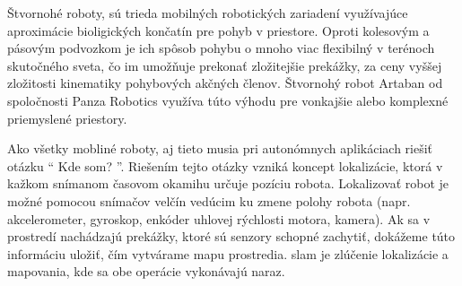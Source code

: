 Štvornohé roboty, sú trieda mobilných robotických zariadení využívajúce aproximácie bioligických končatín pre pohyb v priestore.\newline
Oproti kolesovým a pásovým podvozkom je ich spôsob pohybu o mnoho viac flexibilný v terénoch skutočného sveta, čo im umožňuje prekonať zložitejšie prekážky, za ceny vyššej zložitosti kinematiky pohybových akčných členov.\newline
Štvornohý robot Artaban od spoločnosti Panza Robotics využíva túto výhodu pre vonkajšie alebo komplexné priemyslené priestory.\newline\newline

\noindent Ako všetky mobliné roboty, aj tieto musia pri autonómnych aplikáciach riešiť otázku `` Kde som? ''.\newline
Riešením tejto otázky vzniká koncept lokalizácie, ktorá v kažkom snímanom časovom okamihu určuje pozíciu robota. Lokalizovať robot je možné pomocou snímačov velčín vedúcim ku zmene polohy robota (napr. akcelerometer, gyroskop, enkóder uhlovej rýchlosti motora, kamera).\newline
Ak sa v prostredí nachádzajú prekážky, ktoré sú senzory schopné zachytiť, dokážeme túto informáciu uložiť, čím vytvárame mapu prostredia.\newline
\acrshort{slam} je zlúčenie lokalizácie a mapovania, kde sa obe operácie vykonávajú naraz.